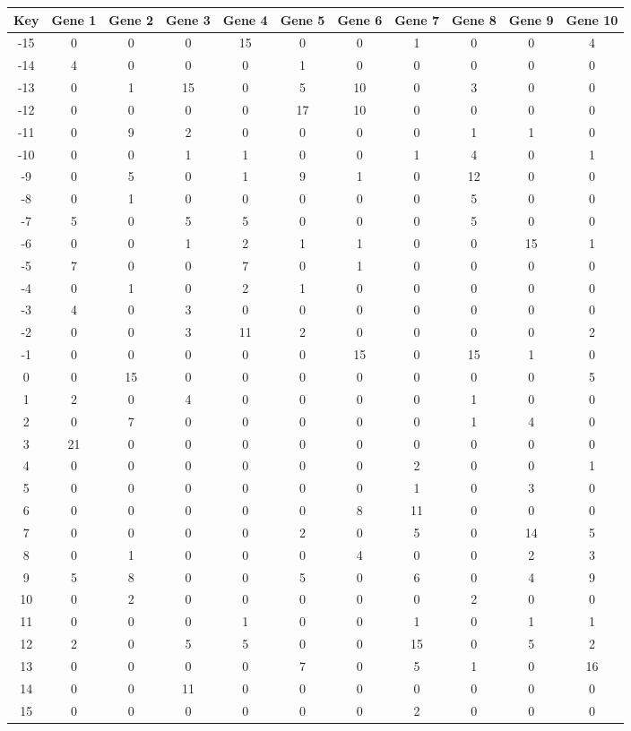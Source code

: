 \begin{tabular}{|c|c|c|c|c|c|c|c|c|c|c|}
\hline
Key & Gene 1 & Gene 2 & Gene 3 & Gene 4 & Gene 5 & Gene 6 & Gene 7 & Gene 8 & Gene 9 & Gene 10 \\
\hline
-15 & 0 & 0 & 0 & 15 & 0 & 0 & 1 & 0 & 0 & 4 \\
-14 & 4 & 0 & 0 & 0 & 1 & 0 & 0 & 0 & 0 & 0 \\
-13 & 0 & 1 & 15 & 0 & 5 & 10 & 0 & 3 & 0 & 0 \\
-12 & 0 & 0 & 0 & 0 & 17 & 10 & 0 & 0 & 0 & 0 \\
-11 & 0 & 9 & 2 & 0 & 0 & 0 & 0 & 1 & 1 & 0 \\
-10 & 0 & 0 & 1 & 1 & 0 & 0 & 1 & 4 & 0 & 1 \\
-9 & 0 & 5 & 0 & 1 & 9 & 1 & 0 & 12 & 0 & 0 \\
-8 & 0 & 1 & 0 & 0 & 0 & 0 & 0 & 5 & 0 & 0 \\
-7 & 5 & 0 & 5 & 5 & 0 & 0 & 0 & 5 & 0 & 0 \\
-6 & 0 & 0 & 1 & 2 & 1 & 1 & 0 & 0 & 15 & 1 \\
-5 & 7 & 0 & 0 & 7 & 0 & 1 & 0 & 0 & 0 & 0 \\
-4 & 0 & 1 & 0 & 2 & 1 & 0 & 0 & 0 & 0 & 0 \\
-3 & 4 & 0 & 3 & 0 & 0 & 0 & 0 & 0 & 0 & 0 \\
-2 & 0 & 0 & 3 & 11 & 2 & 0 & 0 & 0 & 0 & 2 \\
-1 & 0 & 0 & 0 & 0 & 0 & 15 & 0 & 15 & 1 & 0 \\
0 & 0 & 15 & 0 & 0 & 0 & 0 & 0 & 0 & 0 & 5 \\
1 & 2 & 0 & 4 & 0 & 0 & 0 & 0 & 1 & 0 & 0 \\
2 & 0 & 7 & 0 & 0 & 0 & 0 & 0 & 1 & 4 & 0 \\
3 & 21 & 0 & 0 & 0 & 0 & 0 & 0 & 0 & 0 & 0 \\
4 & 0 & 0 & 0 & 0 & 0 & 0 & 2 & 0 & 0 & 1 \\
5 & 0 & 0 & 0 & 0 & 0 & 0 & 1 & 0 & 3 & 0 \\
6 & 0 & 0 & 0 & 0 & 0 & 8 & 11 & 0 & 0 & 0 \\
7 & 0 & 0 & 0 & 0 & 2 & 0 & 5 & 0 & 14 & 5 \\
8 & 0 & 1 & 0 & 0 & 0 & 4 & 0 & 0 & 2 & 3 \\
9 & 5 & 8 & 0 & 0 & 5 & 0 & 6 & 0 & 4 & 9 \\
10 & 0 & 2 & 0 & 0 & 0 & 0 & 0 & 2 & 0 & 0 \\
11 & 0 & 0 & 0 & 1 & 0 & 0 & 1 & 0 & 1 & 1 \\
12 & 2 & 0 & 5 & 5 & 0 & 0 & 15 & 0 & 5 & 2 \\
13 & 0 & 0 & 0 & 0 & 7 & 0 & 5 & 1 & 0 & 16 \\
14 & 0 & 0 & 11 & 0 & 0 & 0 & 0 & 0 & 0 & 0 \\
15 & 0 & 0 & 0 & 0 & 0 & 0 & 2 & 0 & 0 & 0 \\
\hline
\end{tabular}